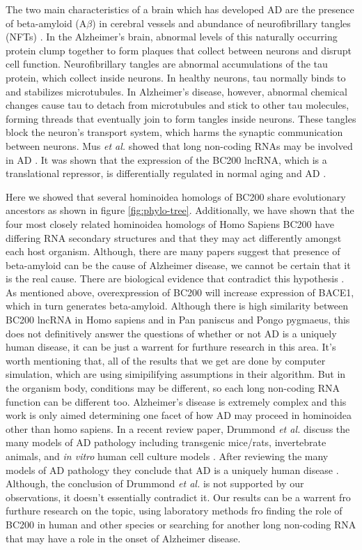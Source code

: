 \documentclass[conference, 11pt]{IEEEtran}
\begin{document}
The two main characteristics of a brain which has developed AD are the presence of beta-amyloid (A$\beta$) in cerebral vessels and abundance of neurofibrillary tangles (NFTs) \cite{deture2019neuropathological}. 
In the Alzheimer’s brain, abnormal levels of this naturally occurring protein clump together to form plaques that collect between neurons and disrupt cell function. 
Neurofibrillary tangles are abnormal accumulations of the tau protein, which collect inside neurons.  
In healthy neurons, tau normally binds to and stabilizes microtubules. 
In Alzheimer’s disease, however, abnormal chemical changes cause tau to detach from microtubules and stick to other tau molecules, forming threads that eventually join to form tangles inside neurons. 
These tangles block the neuron’s transport system, which harms the synaptic communication between neurons\cite{swerdlow2011brain}. 
Mus \emph{et al.} showed that long non-coding RNAs may be involved in AD \cite{mus2007dendritic}. 
It was shown that the expression of the BC200 lncRNA, which is a translational repressor, is differentially regulated in normal aging and AD \cite{mus2007dendritic}. 

Here we showed that several hominoidea homologs of BC200 share evolutionary ancestors as shown in figure \ref{fig:phylo-tree}. 
Additionally, we have shown that the four most closely related hominoidea homologs of Homo Sapiens BC200 have differing RNA secondary structures and that they may act differently amongst each host organism. 
Although, there are many papers suggest that presence of beta-amyloid can be the cause of Alzheimer disease, we cannot be certain that it is the real cause. 
There are biological evidence that contradict this hypothesis \cite{selkoe2016amyloid}. 
As mentioned above, overexpression of BC200 will increase expression of BACE1, which in turn generates beta-amyloid. 
Although there is high similarity between BC200 lncRNA in Homo sapiens and in Pan paniscus and Pongo pygmaeus, this does not definitively answer the questions of whether or not AD is a uniquely human disease, it can be just a warrent for furthure research in this area. 
It's worth mentioning that, all of the results that we get are done by computer simulation, which are using simipilifying assumptions in their algorithm. 
But in the organism body, conditions may be different, so each long non-coding RNA function can be different too. 
Alzheimer’s disease is extremely complex and this work is only aimed determining one facet of how AD may proceed in hominoidea other than homo sapiens. 
In a recent review paper, Drummond \emph{et al.} discuss the many models of AD pathology including transgenic mice/rats, invertebrate animals, and \emph{in vitro} human cell culture models \cite{drummond2017alzheimer}. 
After reviewing the many models of AD pathology they conclude that AD is a uniquely human disease \cite{drummond2017alzheimer}. 
Although, the conclusion of Drummond \emph{et al.} is not supported by our observations, it doesn't essentially contradict it. 
Our results can be a warrent fro furthure research on the topic, using laboratory methods fro finding the role of BC200 in human and other species or searching for another long non-coding RNA that may have a role in the onset of Alzheimer disease.
\end{document}
